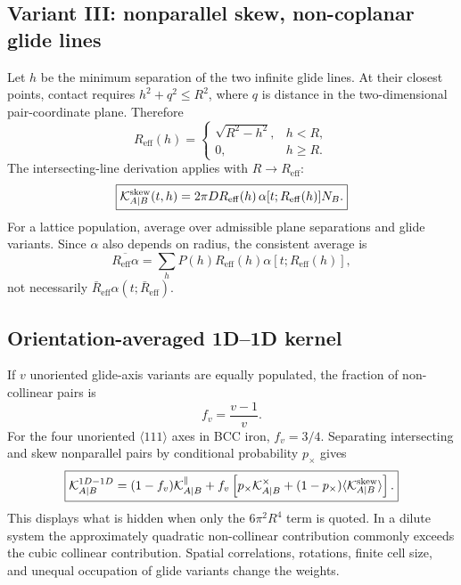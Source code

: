 \documentclass[11pt]{article}
\newcommand{\KK}{\mathcal{K}}
\newcommand{\eff}{\mathrm{eff}}
\begin{document}
\subsection{Variant III: nonparallel skew, non-coplanar glide lines}
Let \(h\) be the minimum separation of the two infinite glide lines. At their
closest points, contact requires \(h^2+q^2\le R^2\), where \(q\) is distance
in the two-dimensional pair-coordinate plane. Therefore
\begin{equation}
 R_{\eff}(h)=
 \begin{cases}
 \sqrt{R^2-h^2},&h<R,\\
 0,&h\ge R.
 \end{cases}                                      \label{eq:Reff}
\end{equation}
The intersecting-line derivation applies with \(R\to R_{\eff}\):
\begin{equation}
 \boxed{\KK_{A|B}^{\rm skew}(t,h)
 =2\pi D R_{\eff}(h)\,
 \alpha[t;R_{\eff}(h)]N_B.}                        \label{eq:Kskew}
\end{equation}
For a lattice population, average over admissible plane separations and glide
variants. Since \(\alpha\) also depends on radius, the consistent average is
\begin{equation}
 \overline{R_{\eff}\alpha}
 =\sum_hP(h)R_{\eff}(h)\alpha[t;R_{\eff}(h)],
\end{equation}
not necessarily \(\bar R_{\eff}\alpha(t;\bar R_{\eff})\).

\subsection{Orientation-averaged 1D--1D kernel}
If \(v\) unoriented glide-axis variants are equally populated, the fraction of
non-collinear pairs is
\begin{equation}
 f_v=\frac{v-1}{v}.
\end{equation}
For the four unoriented \(\langle111\rangle\) axes in BCC iron, \(f_v=3/4\).
Separating intersecting and skew nonparallel pairs by conditional probability
\(p_\times\) gives
\begin{equation}
 \boxed{\KK_{A|B}^{1D-1D}
 =(1-f_v)\KK_{A|B}^{\parallel}
 +f_v\left[p_\times\KK_{A|B}^{\times}
 +(1-p_\times)\langle\KK_{A|B}^{\rm skew}\rangle\right].}
 \label{eq:total-1d1d}
\end{equation}
This displays what is hidden when only the \(6\pi^2R^4\) term is quoted. In a
dilute system the approximately quadratic non-collinear contribution commonly
exceeds the cubic collinear contribution. Spatial correlations, rotations,
finite cell size, and unequal occupation of glide variants change the weights.
\end{document}
